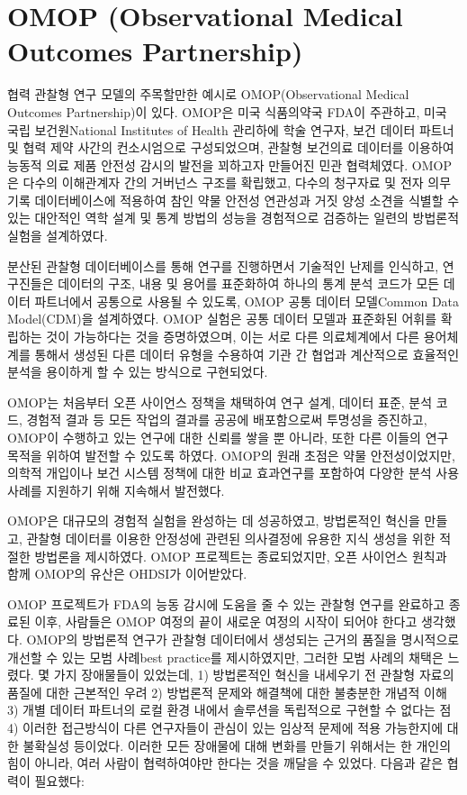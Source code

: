 \documentclass[11pt]{book}
\theoremstyle{definition}
\theoremstyle{definition}
\theoremstyle{definition}
\theoremstyle{remark}
\begin{document}
\section{OMOP (Observational Medical Outcomes
Partnership)}\label{omop-observational-medical-outcomes-partnership}

협력 관찰형 연구 모델의 주목할만한 예시로 OMOP(Observational Medical
Outcomes Partnership)이 있다. OMOP은 미국 식품의약국 FDA이 주관하고,
미국 국립 보건원National Institutes of Health 관리하에 학술 연구자, 보건
데이터 파트너 및 협력 제약 사간의 컨소시엄으로 구성되었으며, 관찰형
보건의료 데이터를 이용하여 능동적 의료 제품 안전성 감시의 발전을
꾀하고자 만들어진 민관 협력체였다. \citep{stang2010omop} OMOP은 다수의
이해관계자 간의 거버넌스 구조를 확립했고, 다수의 청구자료 및 전자 의무
기록 데이터베이스에 적용하여 참인 약물 안전성 연관성과 거짓 양성 소견을
식별할 수 있는 대안적인 역학 설계 및 통계 방법의 성능을 경험적으로
검증하는 일련의 방법론적 실험을 설계하였다.

분산된 관찰형 데이터베이스를 통해 연구를 진행하면서 기술적인 난제를
인식하고, 연구진들은 데이터의 구조, 내용 및 용어를 표준화하여 하나의
통계 분석 코드가 모든 데이터 파트너에서 공통으로 사용될 수 있도록, OMOP
공통 데이터 모델Common Data Model(CDM)을 설계하였다.
\citep{overhage2012cdm} OMOP 실험은 공통 데이터 모델과 표준화된 어휘를
확립하는 것이 가능하다는 것을 증명하였으며, 이는 서로 다른 의료체계에서
다른 용어체계를 통해서 생성된 다른 데이터 유형을 수용하여 기관 간 협업과
계산적으로 효율적인 분석을 용이하게 할 수 있는 방식으로 구현되었다.

OMOP는 처음부터 오픈 사이언스 정책을 채택하여 연구 설계, 데이터 표준,
분석 코드, 경험적 결과 등 모든 작업의 결과를 공공에 배포함으로써
투명성을 증진하고, OMOP이 수행하고 있는 연구에 대한 신뢰를 쌓을 뿐
아니라, 또한 다른 이들의 연구 목적을 위하여 발전할 수 있도록 하였다.
OMOP의 원래 초점은 약물 안전성이었지만, 의학적 개입이나 보건 시스템
정책에 대한 비교 효과연구를 포함하여 다양한 분석 사용사례를 지원하기
위해 지속해서 발전했다.

OMOP은 대규모의 경험적 실험을 완성하는 데 성공하였고,
\citep{ryan2012omop, ryan2013omop} 방법론적인 혁신을 만들고,
\citep{schuemie_2014} 관찰형 데이터를 이용한 안정성에 관련된 의사결정에
유용한 지식 생성을 위한 적절한 방법론을
제시하였다.\citep{madigan_2013, madigan2013design} OMOP 프로젝트는
종료되었지만, 오픈 사이언스 원칙과 함께 OMOP의 유산은 OHDSI가
이어받았다.

OMOP 프로젝트가 FDA의 능동 감시에 도움을 줄 수 있는 관찰형 연구를
완료하고 종료된 이후, 사람들은 OMOP 여정의 끝이 새로운 여정의 시작이
되어야 한다고 생각했다. OMOP의 방법론적 연구가 관찰형 데이터에서
생성되는 근거의 품질을 명시적으로 개선할 수 있는 모범 사례best
practice를 제시하였지만, 그러한 모범 사례의 채택은 느렸다. 몇 가지
장애물들이 있었는데, 1) 방법론적인 혁신을 내세우기 전 관찰형 자료의
품질에 대한 근본적인 우려 2) 방법론적 문제와 해결책에 대한 불충분한
개념적 이해 3) 개별 데이터 파트너의 로컬 환경 내에서 솔루션을 독립적으로
구현할 수 없다는 점 4) 이러한 접근방식이 다른 연구자들이 관심이 있는
임상적 문제에 적용 가능한지에 대한 불확실성 등이었다. 이러한 모든
장애물에 대해 변화를 만들기 위해서는 한 개인의 힘이 아니라, 여러 사람이
협력하여야만 한다는 것을 깨달을 수 있었다. 다음과 같은 협력이 필요했다:
\end{document}
